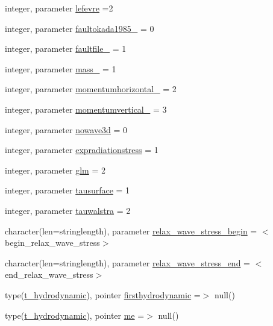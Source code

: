 \begin{DoxyCompactItemize}
\item 
integer, parameter \mbox{\hyperlink{namespacemodulehydrodynamic_a62625835225de0a2df2625e9f7639119}{lefevre}} =2
\item 
integer, parameter \mbox{\hyperlink{namespacemodulehydrodynamic_a35bdaf12b19ad1e6e7cc5a904f76f07e}{faultokada1985\+\_\+}} = 0
\item 
integer, parameter \mbox{\hyperlink{namespacemodulehydrodynamic_a22c3cb09207699a1cb89faf979baa68a}{faultfile\+\_\+}} = 1
\item 
integer, parameter \mbox{\hyperlink{namespacemodulehydrodynamic_a95ba96c7e6b2991a960242c61fc67d71}{mass\+\_\+}} = 1
\item 
integer, parameter \mbox{\hyperlink{namespacemodulehydrodynamic_aa2a5497af9ce00e73311b74d9612da51}{momentumhorizontal\+\_\+}} = 2
\item 
integer, parameter \mbox{\hyperlink{namespacemodulehydrodynamic_a0563947ca0b057d4dc7df6ac00e5b0bf}{momentumvertical\+\_\+}} = 3
\item 
integer, parameter \mbox{\hyperlink{namespacemodulehydrodynamic_aa91ea572ae7bd08e541e522a32ed77a4}{nowave3d}} = 0
\item 
integer, parameter \mbox{\hyperlink{namespacemodulehydrodynamic_abbbd4f40064713967aac1a39bfc4bf05}{expradiationstress}} = 1
\item 
integer, parameter \mbox{\hyperlink{namespacemodulehydrodynamic_a4e69c9379fc556ae0fc21a588195f0a0}{glm}} = 2
\item 
integer, parameter \mbox{\hyperlink{namespacemodulehydrodynamic_a892036fbc22375e1172b30c374287e1a}{tausurface}} = 1
\item 
integer, parameter \mbox{\hyperlink{namespacemodulehydrodynamic_af093f4244521e685178dab331a9ef8a4}{tauwalstra}} = 2
\item 
character(len=stringlength), parameter \mbox{\hyperlink{namespacemodulehydrodynamic_a359bae8796db1f4d86d53da366a97366}{relax\+\_\+wave\+\_\+stress\+\_\+begin}} = \textquotesingle{}$<$begin\+\_\+relax\+\_\+wave\+\_\+stress$>$\textquotesingle{}
\item 
character(len=stringlength), parameter \mbox{\hyperlink{namespacemodulehydrodynamic_a0aa6ff4d2a7a8beb497a742c1455435e}{relax\+\_\+wave\+\_\+stress\+\_\+end}} = \textquotesingle{}$<$end\+\_\+relax\+\_\+wave\+\_\+stress$>$\textquotesingle{}
\item 
type(\mbox{\hyperlink{structmodulehydrodynamic_1_1t__hydrodynamic}{t\+\_\+hydrodynamic}}), pointer \mbox{\hyperlink{namespacemodulehydrodynamic_ade799e46b48fe9cce4b1d0557b736f07}{firsthydrodynamic}} =$>$ null()
\item 
type(\mbox{\hyperlink{structmodulehydrodynamic_1_1t__hydrodynamic}{t\+\_\+hydrodynamic}}), pointer \mbox{\hyperlink{namespacemodulehydrodynamic_aa15498bfec419d54a902a53a6eaece07}{me}} =$>$ null()
\end{DoxyCompactItemize}


